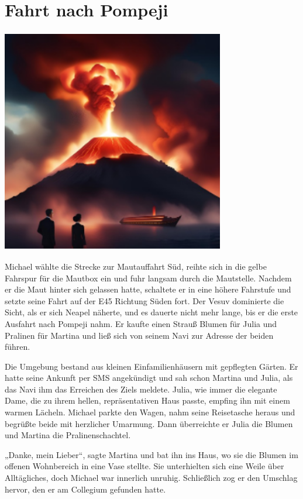 \documentclass[
]{article}
\begin{document}
\section{Fahrt nach Pompeji}\label{fahrt-nach-pompeji}

\includegraphics[width=3.83373in,height=3.87746in]{media/image6.png}

Michael wählte die Strecke zur Mautauffahrt Süd, reihte sich in die
gelbe Fahrspur für die Mautbox ein und fuhr langsam durch die
Mautstelle. Nachdem er die Maut hinter sich gelassen hatte, schaltete er
in eine höhere Fahrstufe und setzte seine Fahrt auf der E45 Richtung
Süden fort. Der Vesuv dominierte die Sicht, als er sich Neapel näherte,
und es dauerte nicht mehr lange, bis er die erste Ausfahrt nach Pompeji
nahm. Er kaufte einen Strauß Blumen für Julia und Pralinen für Martina
und ließ sich von seinem Navi zur Adresse der beiden führen.

Die Umgebung bestand aus kleinen Einfamilienhäusern mit gepflegten
Gärten. Er hatte seine Ankunft per SMS angekündigt und sah schon Martina
und Julia, als das Navi ihm das Erreichen des Ziels meldete. Julia, wie
immer die elegante Dame, die zu ihrem hellen, repräsentativen Haus
passte, empfing ihn mit einem warmen Lächeln. Michael parkte den Wagen,
nahm seine Reisetasche heraus und begrüßte beide mit herzlicher
Umarmung. Dann überreichte er Julia die Blumen und Martina die
Pralinenschachtel.

„Danke, mein Lieber``, sagte Martina und bat ihn ins Haus, wo sie die
Blumen im offenen Wohnbereich in eine Vase stellte. Sie unterhielten
sich eine Weile über Alltägliches, doch Michael war innerlich unruhig.
Schließlich zog er den Umschlag hervor, den er am Collegium gefunden
hatte.
\end{document}
